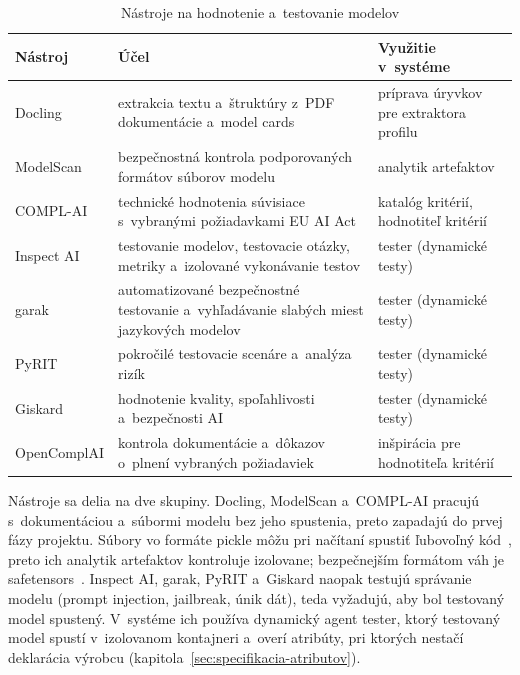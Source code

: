 \begin{table}[ht]
    \centering
    \caption{Nástroje na hodnotenie a~testovanie modelov}
    \label{tab:nastroje}
    \small
    \begin{tabular}{@{}>{\raggedright\arraybackslash}p{2.8cm}>{\raggedright\arraybackslash}p{6.1cm}>{\raggedright\arraybackslash}p{5.4cm}@{}}
        \toprule
        \textbf{Nástroj} & \textbf{Účel} & \textbf{Využitie v~systéme} \\
        \midrule
        Docling~\cite{docling} & extrakcia textu a~štruktúry z~PDF
            dokumentácie a~model cards & príprava úryvkov pre extraktora
            profilu \\
        ModelScan~\cite{modelscan} & bezpečnostná kontrola podporovaných
            formátov súborov modelu & analytik artefaktov \\
        COMPL-AI~\cite{guldimann2024complai} & technické hodnotenia
            súvisiace s~vybranými požiadavkami EU AI Act & katalóg
            kritérií, hodnotiteľ kritérií \\
        Inspect AI~\cite{inspect} & testovanie modelov, testovacie otázky,
            metriky a~izolované vykonávanie testov & tester (dynamické
            testy) \\
        garak~\cite{garak} & automatizované bezpečnostné testovanie
            a~vyhľadávanie slabých miest jazykových modelov & tester
            (dynamické testy) \\
        \midrule
        PyRIT~\cite{pyrit} & pokročilé testovacie scenáre a~analýza rizík
            & tester (dynamické testy) \\
        Giskard~\cite{giskard} & hodnotenie kvality, spoľahlivosti
            a~bezpečnosti AI & tester (dynamické testy) \\
        OpenComplAI & kontrola dokumentácie a~dôkazov o~plnení vybraných
            požiadaviek & inšpirácia pre hodnotiteľa kritérií \\
        \bottomrule
    \end{tabular}
\end{table}

Nástroje sa delia na dve skupiny. Docling, ModelScan a~COMPL-AI
pracujú s~dokumentáciou a~súbormi modelu bez jeho spustenia, preto
zapadajú do prvej fázy projektu. Súbory vo formáte pickle môžu pri
načítaní spustiť ľubovoľný kód~\cite{hf-pickle}, preto ich analytik
artefaktov kontroluje izolovane; bezpečnejším formátom váh je
safetensors~\cite{safetensors}. Inspect AI, garak, PyRIT a~Giskard
naopak testujú správanie modelu (prompt injection, jailbreak, únik dát),
teda vyžadujú, aby bol testovaný model spustený. V~systéme ich používa
dynamický agent tester, ktorý testovaný model spustí v~izolovanom
kontajneri a~overí atribúty, pri ktorých nestačí deklarácia výrobcu
(kapitola~\ref{sec:specifikacia-atributov}).

